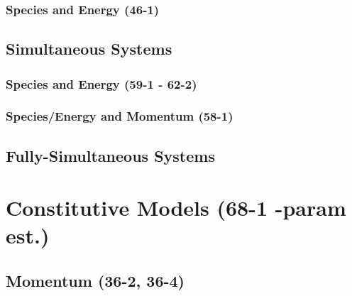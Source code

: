 \documentclass{mitqualif}
\begin{document}
\subsubsection{Species and Energy (46-1)}










\subsection{Simultaneous Systems}
\subsubsection{Species and Energy (59-1 - 62-2)}









\subsubsection{Species/Energy and Momentum (58-1)}


















\subsection{Fully-Simultaneous Systems}
\section{Constitutive Models (68-1 -param est.)}

\subsection{Momentum (36-2, 36-4)}


\end{document}
